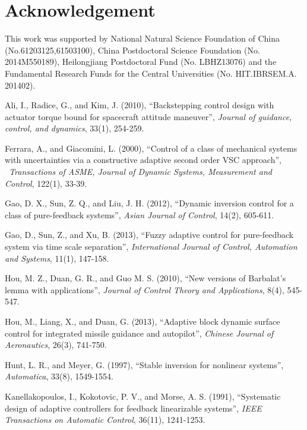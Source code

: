 \documentclass{tSYS2e}
\theoremstyle{plain}
\theoremstyle{definition}
\begin{document}
\section{Acknowledgement}
This work was supported by National Natural Science Foundation of China (No.61203125,61503100),
China Postdoctoral Science Foundation (No. 2014M550189), Heilongjiang Postdoctoral Fund (No. LBHZ13076)
and the Fundamental Research Funds for the Central Universities (No. HIT.IBRSEM.A. 201402).

\begin{thebibliography}{99}

 Ali, I., Radice, G., and Kim, J.
(2010), ``Backstepping control design with actuator torque bound for
spacecraft attitude maneuver'', {\itshape Journal of guidance, control, and dynamics},
33(1), 254-259.

 Ferrara, A., and
Giacomini, L. (2000), ``Control of a class of mechanical systems with
uncertainties via a constructive adaptive second order VSC approach'', {\itshape
\ Transactions of ASME, Journal of Dynamic Systems, Measurement and Control},
122(1), 33-39.

 Gao, D. X., Sun, Z. Q., and Liu,
J. H. (2012), ``Dynamic inversion control for a class of pure-feedback
systems'', {\itshape Asian Journal of Control}, 14(2), 605-611.

 Gao, D., Sun, Z., and Xu, B.
(2013), ``Fuzzy adaptive control for pure-feedback system via time scale
separation'', {\itshape International Journal of Control, Automation and Systems}, 11(1),
147-158.

 Hou, M. Z., Duan, G. R., and Guo
M. S. (2010), ``New versions of Barbalat's lemma with applications'', {\itshape
Journal of Control Theory and Applications}, 8(4), 545-547.

Hou, M., Liang, X., and Duan, G. (2013),
``Adaptive block dynamic surface control for integrated missile
guidance and autopilot'', {\itshape Chinese Journal of Aeronautics}, 26(3), 741-750.

 Hunt, L. R., and Meyer, G.
(1997), ``Stable inversion for nonlinear systems'', {\itshape Automatica}, 33(8),
1549-1554.

Kanellakopoulos, I., Kokotovic, P. V., and Morse, A. S. (1991), ``Systematic
design of adaptive controllers for feedback linearizable systems'', {\itshape IEEE Transactions on Automatic
Control}, 36(11), 1241-1253.


\end{thebibliography}
\end{document}
